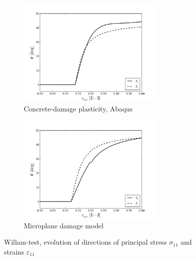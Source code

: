 \documentclass[main.tex]{subfiles}
\begin{document}
\begin{figure} 
    \centering
    \begin{subfigure}[b]{0.4\textwidth}
        \includegraphics[width=7cm]{fig/WillamTest-Theta-Eps11-CDP.png}
        \caption{Concrete-damage plasticity, Abaqus}
        \label{FIGWillamTestSigEps}
    \end{subfigure}
    \begin{subfigure}[b]{0.4\textwidth}
        \includegraphics[width=7cm]{fig/WillamTest-Theta-Eps11-MDM.png}
        \caption{Microplane damage model}
        \label{FIGWillamTestSigEps}
    \end{subfigure}
    \caption{Willam-test, evolution of directions of principal stress $\sigma_{11}$ and 
    strains $\varepsilon_{11}$}
\end{figure}
\end{document}

